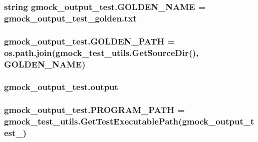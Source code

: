 \subsubsection[{\texorpdfstring{G\+O\+L\+D\+E\+N\+\_\+\+N\+A\+ME}{GOLDEN_NAME}}]{\setlength{\rightskip}{0pt plus 5cm}string gmock\+\_\+output\+\_\+test.\+G\+O\+L\+D\+E\+N\+\_\+\+N\+A\+ME = \textquotesingle{}gmock\+\_\+output\+\_\+test\+\_\+golden.\+txt\textquotesingle{}}\hypertarget{namespacegmock__output__test_ac6e9298ea3967e6fa704c9c246d6cc18}{}\label{namespacegmock__output__test_ac6e9298ea3967e6fa704c9c246d6cc18}
\subsubsection[{\texorpdfstring{G\+O\+L\+D\+E\+N\+\_\+\+P\+A\+TH}{GOLDEN_PATH}}]{\setlength{\rightskip}{0pt plus 5cm}gmock\+\_\+output\+\_\+test.\+G\+O\+L\+D\+E\+N\+\_\+\+P\+A\+TH = os.\+path.\+join({\bf gmock\+\_\+test\+\_\+utils.\+Get\+Source\+Dir}(), {\bf G\+O\+L\+D\+E\+N\+\_\+\+N\+A\+ME})}\hypertarget{namespacegmock__output__test_a632c0fbf08500e4ed3c0e33f5e2ac771}{}\label{namespacegmock__output__test_a632c0fbf08500e4ed3c0e33f5e2ac771}
\subsubsection[{\texorpdfstring{output}{output}}]{\setlength{\rightskip}{0pt plus 5cm}gmock\+\_\+output\+\_\+test.\+output}\hypertarget{namespacegmock__output__test_a4277f8598ba3835393fe82e82d09375d}{}\label{namespacegmock__output__test_a4277f8598ba3835393fe82e82d09375d}
\subsubsection[{\texorpdfstring{P\+R\+O\+G\+R\+A\+M\+\_\+\+P\+A\+TH}{PROGRAM_PATH}}]{\setlength{\rightskip}{0pt plus 5cm}gmock\+\_\+output\+\_\+test.\+P\+R\+O\+G\+R\+A\+M\+\_\+\+P\+A\+TH = {\bf gmock\+\_\+test\+\_\+utils.\+Get\+Test\+Executable\+Path}(\textquotesingle{}gmock\+\_\+output\+\_\+test\+\_\+\textquotesingle{})}\hypertarget{namespacegmock__output__test_a03aac0fac952a0b3648340f529af7f59}{}\label{namespacegmock__output__test_a03aac0fac952a0b3648340f529af7f59}
